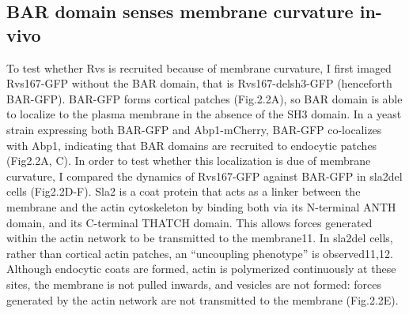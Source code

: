 	\subsection{BAR domain senses membrane curvature in-vivo}
	To test whether Rvs is recruited because of membrane curvature, I first imaged Rvs167-GFP without the BAR domain, that is Rvs167-delsh3-GFP (henceforth BAR-GFP). BAR-GFP forms cortical patches (Fig.2.2A), so BAR domain is able to localize to the plasma membrane in the absence of the SH3 domain. In a yeast strain expressing both BAR-GFP and Abp1-mCherry, BAR-GFP co-localizes with Abp1, indicating that BAR domains are recruited to endocytic patches (Fig2.2A, C). In order to test whether this localization is due of membrane curvature, I compared the dynamics of Rvs167-GFP against BAR-GFP in sla2del cells (Fig2.2D-F). Sla2 is a coat protein that acts as a linker between the membrane and the actin cytoskeleton by binding both via its N-terminal ANTH domain, and its C-terminal THATCH domain. This allows forces generated within the actin network to be transmitted to the membrane11. In sla2del cells, rather than cortical actin patches, an “uncoupling phenotype” is observed11,12. Although endocytic coats are formed, actin is polymerized continuously at these sites, the membrane is not pulled inwards, and vesicles are not formed: forces generated by the actin network are not transmitted to the membrane (Fig.2.2E).

